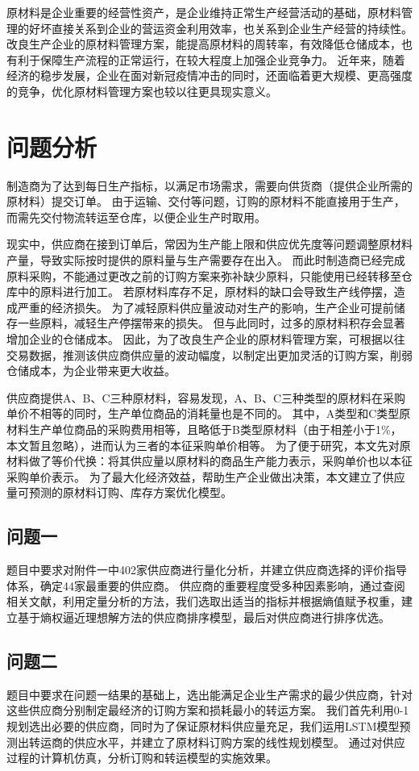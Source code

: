 
原材料是企业重要的经营性资产，是企业维持正常生产经营活动的基础，原材料管理的好坏直接关系到企业的营运资金利用效率，也关系到企业生产经营的持续性\cite{杨庆军2012浅谈}。
改良生产企业的原材料管理方案，能提高原材料的周转率，有效降低仓储成本，也有利于保障生产流程的正常运行，在较大程度上加强企业竞争力\cite{李红燕2018论企业原材料的管理和研究}。
近年来，随着经济的稳步发展，企业在面对新冠疫情冲击的同时，还面临着更大规模、更高强度的竞争，优化原材料管理方案也较以往更具现实意义。%

\section{问题分析}
制造商为了达到每日生产指标，以满足市场需求，需要向供货商（提供企业所需的原材料）提交订单。
由于运输、交付等问题，订购的原材料不能直接用于生产，而需先交付物流转运至仓库，以便企业生产时取用。

现实中，供应商在接到订单后，常因为生产能上限和供应优先度等问题调整原材料产量，导致实际按时提供的原料量与生产需要存在出入。
而此时制造商已经完成原料采购，不能通过更改之前的订购方案来弥补缺少原料，只能使用已经转移至仓库中的原料进行加工。
若原材料库存不足，原材料的缺口会导致生产线停摆，造成严重的经济损失。
为了减轻原料供应量波动对生产的影响，生产企业可提前储存一些原料，减轻生产停摆带来的损失。
但与此同时，过多的原材料积存会显著增加企业的仓储成本。
因此，为了改良生产企业的原材料管理方案，可根据以往交易数据，推测该供应商供应量的波动幅度，以制定出更加灵活的订购方案，削弱仓储成本，为企业带来更大收益。

供应商提供A、B、C三种原材料，容易发现，A、B、C三种类型的原材料在采购单价不相等的同时，生产单位商品的消耗量也是不同的。
其中，A类型和C类型原材料生产单位商品的采购费用相等，且略低于B类型原材料（由于相差小于1\%，本文暂且忽略），进而认为三者的本征采购单价相等。
为了便于研究，本文先对原材料做了等价代换：将其供应量以原材料的商品生产能力表示，采购单价也以本征采购单价表示。
为了最大化经济效益，帮助生产企业做出决策，本文建立了供应量可预测的原材料订购、库存方案优化模型。

\subsection{问题一}
题目中要求对附件一中402家供应商进行量化分析，并建立供应商选择的评价指导体系，确定44家最重要的供应商。
供应商的重要程度受多种因素影响，通过查阅相关文献，利用定量分析的方法，我们选取出适当的指标并根据熵值赋予权重，建立基于熵权逼近理想解方法的供应商排序模型，最后对供应商进行排序优选。


\subsection{问题二}
题目中要求在问题一结果的基础上，选出能满足企业生产需求的最少供应商，针对这些供应商分别制定最经济的订购方案和损耗最小的转运方案。
我们首先利用0-1规划选出必要的供应商，同时为了保证原材料供应量充足，我们运用LSTM模型预测出转运商的供应水平，并建立了原材料订购方案的线性规划模型。
通过对供应过程的计算机仿真，分析订购和转运模型的实施效果。


